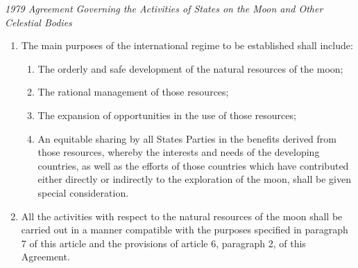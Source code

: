 \begin{conventiondetails}{\textit{1979 Agreement Governing the Activities of States on the Moon and Other Celestial Bodies}}
\begin{enumerate}
        \item The main purposes of the international regime to be established shall include:
        \begin{enumerate}[label=(\alph*)]
            \item The orderly and safe development of the natural resources of the moon;
            \item The rational management of those resources;
            \item The expansion of opportunities in the use of those resources;
            \item An equitable sharing by all States Parties in the benefits derived from those resources, whereby the interests and needs of the developing countries, as well as the efforts of those countries which have contributed either directly or indirectly to the exploration of the moon, shall be given special consideration.
        \end{enumerate}
        \item All the activities with respect to the natural resources of the moon shall be carried out in a manner compatible with the purposes specified in paragraph 7 of this article and the provisions of article 6, paragraph 2, of this Agreement.
    \end{enumerate}
\end{conventiondetails}